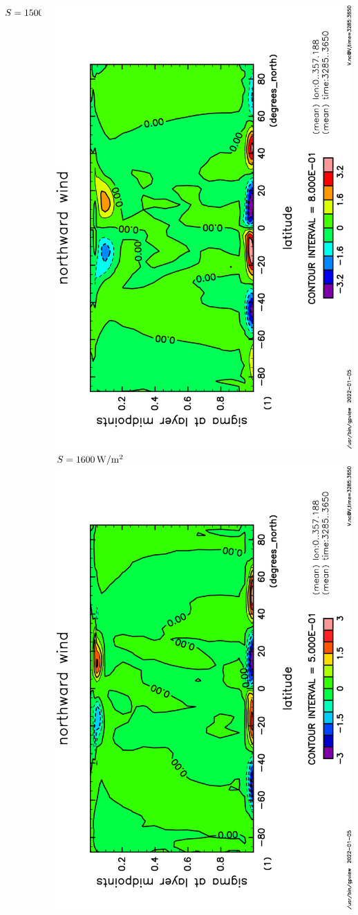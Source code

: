 \documentclass[aspectratio=149,9pt,fleqn]{beamer}
\begin{document}
\begin{frame}
\begin{columns}[T]
\begin{column}{.3\textwidth}
			\(S=1500\hmu{W/m^2}\)
		\end{column}
		\begin{column}{.3\textwidth}
			\centering
			\includegraphics[height=\textwidth,angle=-90]{S1600/V,time=3285:3650-crop.pdf}
			\(S=1600\hmu{W/m^2}\)\\
			\includegraphics[height=\textwidth,angle=-90]{S1800/V,time=3285:3650-crop.pdf}

\end{column}
\end{columns}
\end{frame}
\end{document}
